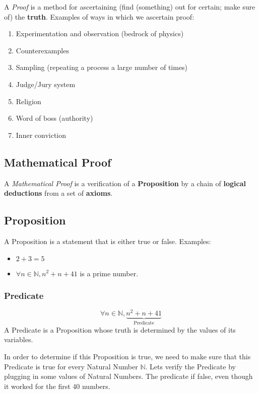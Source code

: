 A \textit{Proof} is a method for ascertaining (find (something) out for certain; make sure of) the \textbf{truth}. Examples of ways in which we ascertain proof:
\begin{enumerate}
    \item Experimentation and observation (bedrock of physics)
    \item Counterexamples
    \item Sampling (repeating a process a large number of times)
    \item Judge/Jury system
    \item Religion
    \item Word of boss (authority)
    \item Inner conviction
\end{enumerate}

\subsection{Mathematical Proof}
A \textit{Mathematical Proof} is a verification of a \textbf{Proposition} by a chain of \textbf{logical deductions} from a set of \textbf{axioms}.

\subsection{Proposition}
A Proposition is a statement that is either true or false. Examples:
\begin{itemize}
    \item $2+3=5$
    \item $\forall n\in  \mathbb{N}, n^2+n+41$ is a prime number.
\end{itemize}

\subsubsection{Predicate}
$$
    \forall n \in \mathbb{N}, \underbrace{n^2 + n + 41}_{\text{Predicate}}
$$
A Predicate is a Proposition whose truth is determined by the values of its variables.

In order to determine if this Proposition is true, we need to make sure that this Predicate is true for every Natural Number $\mathbb{N}$. Lets verify the Predicate by plugging in some values of Natural Numbers. The predicate if false, even though it worked for the first 40 numbers.

